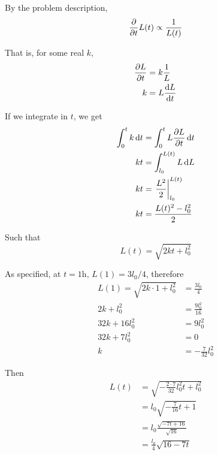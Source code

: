 \setlength{\columnseprule}{0.4pt}
\raggedcolumns\begin{multicols}{2}
    By the problem description, \[
        \pdv{t} L(t) \propto \frac{1}{L(t)}
    \]

    That is, for some real $k$,
    \begin{align*}
        \pdv{L}{t} &= k \frac{1}{L} \\
        k &= L \dv{L}{t}
    \end{align*}

    If we integrate in $t$, we get
    \begin{align*}
        \int_0^t k \dd{t} &= \int_0^t L \pdv{L}{t} \dd{t} \\
        k t &= \int_{l_0}^{L(t)} L \dd{L} \\
        k t &= \eval{\frac{L^2}{2}}_{l_0}^{L(t)} \\
        k t &= \frac{L(t)^2 - l_0^2}{2}
    \end{align*}

    Such that \[
        L(t) = \sqrt{2 k t + l_0^2}
    \]

    As specified, at $t = 1 \text{h}$, $L(1) = 3 l_0 / 4$, therefore
    \begin{align*}
        L(1) = \sqrt{2 k \cdot 1 + l_0^2} &= \frac{3 l_0}{4} \\
            2 k + l_0^2 &= \frac{9 l_0^2}{16} \\
            32 k + 16 l_0^2 &= 9 l_0^2 \\
            32 k + 7 l_0^2 &= 0 \\
            k &= - \frac{7}{32} l_0^2
    \end{align*}

    Then \begin{align*}
        L(t) &= \sqrt{- \frac{2 \cdot 7}{32} l_0^2 t + l_0^2} \\
            &= l_0 \sqrt{- \frac{7}{16} t + 1} \\
            &= l_0 \frac{\sqrt{- 7 t + 16}}{\sqrt{16}} \\
            &= \frac{l_0}{4} \sqrt{16 - 7 t}
    \end{align*}
\end{multicols}
\setlength{\columnseprule}{0pt}
